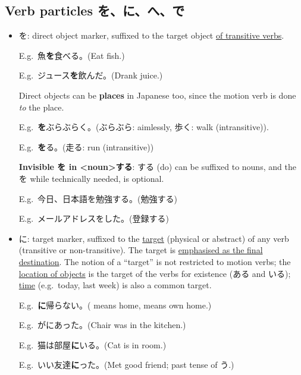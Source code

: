 \documentclass[../nihongo-gakushuu-kyouzai.tex]{subfiles}
\begin{document}
\subsection{Verb particles を、に、へ、で}\label{sec:verb-particles}
\begin{itemize}
    \item を: direct object marker, suffixed to the target object \ul{of transitive verbs}.

    E.g.\ 魚\textbf{を}食べる。(Eat fish.)

    E.g.\ ジュース\textbf{を}飲んだ。(Drank juice.)

    Direct objects can be \textbf{places} in Japanese too, since the motion verb is done \emph{to} the place. 

    E.g.\ \textbf{を}ぶらぶらく。(ぶらぶら: aimlessly, 歩く: walk (intransitive)).

    E.g.\ \textbf{を}る。(走る: run (intransitive))

    \textbf{Invisible を in <noun>する}: する (do) can be suffixed to nouns, and the を while technically needed, is optional.

    E.g.\ 今日、日本語を勉強\cancel{[を]}する。(勉強\cancel{[を]}する)

    E.g.\ メールアドレスを\cancel{[を]}した。(登録\cancel{[を]}する)
    \item に: target marker, suffixed to the \ul{target} (physical or abstract) of any verb (transitive or non-transitive). The target is \ul{emphasised as the final destination}. The notion of a ``target'' is not restricted to motion verbs; the \ul{location of objects} is the target of the verbs for existence (ある and いる); \ul{time} (e.g.\ today, last week) is also a common target.


    E.g.\ \textbf{に}帰らない。( means home,  means own home.)


    E.g.\ がにあった。(Chair was in the kitchen.)

    E.g.\ 猫は部屋\textbf{に}いる。(Cat is in room.)

    E.g.\ いい友達\textbf{に}った。(Met good friend; past tense of う.)


\end{itemize}
\end{document}
